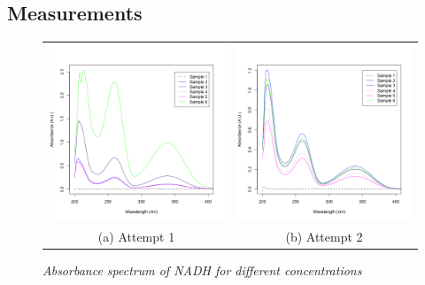 \documentclass[a4paper,10pt]{article}
\begin{document}
        \subsection*{Measurements}
            \begin{figure}[H]
                \centering
                \begin{tabular}{c c}
                    \includegraphics[width=215px]{../resources/absorption_r1_spectrum.png} &
                    \includegraphics[width=215px]{../resources/absorption_r2_spectrum.png} \\
                    (a) Attempt 1 & (b) Attempt 2\\
                \end{tabular}
                \caption{\it Absorbance spectrum of NADH for different concentrations}\label{fig:abs_spectrum}
            \end{figure}
\end{document}
